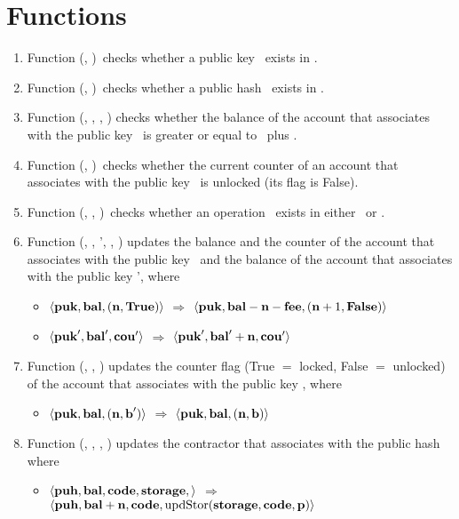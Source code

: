 \documentclass[a4paper]{llncs}
\begin{document}
\section{Functions}
\begin{enumerate}
    \item Function \CHECKPUB (\PUK, \MANAGERS)\ checks whether a public key \PUK\ exists in \MANAGERS.
    \item Function \CHECKPUH (\PUH, \CONTRACTORS)\ checks whether a public hash \PUH\ exists in \CONTRACTORS.
    \item Function \CHECKBAL (\MANAGERS, \PUK, \NTEZ, \MTEZ) checks whether the balance of the account that associates with the public key \PUK\ is greater or equal to \NTEZ\ plus \MTEZ.
    \item Function \CHECKCOU (\MANAGERS, \PUK)\ checks whether the current counter of an account that associates with the public key \PUK\ is unlocked (its flag is False).
    \item Function \CHECKEXIST (\OPH, \PENDING, \ACCEPTED)\ checks whether an operation  \OPH\ exists in either \PENDING\ or \ACCEPTED.
    \item Function \UPDATESUCC(\MANAGERS, \PUK, \PUK', \NTEZ, \MTEZ) updates the balance and the counter of the account that associates with the public key \PUK\ and the balance of the account that associates with the public key \PUK', where
    \begin{itemize}
        \item[]  $\langle  \textbf{puk}, \textbf{bal}, (\textbf{n}, \textbf{True}) \rangle $ $\Rightarrow$ $\langle  \textbf{puk}, \textbf{bal} - \textbf{n} - \textbf{fee}, (\textbf{n} + 1, \textbf{False}) \rangle $      
        \item[] $\langle  \textbf{puk}', \textbf{bal}', \textbf{cou}' \rangle$ $\Rightarrow$ $\langle  \textbf{puk}', \textbf{bal}' + \textbf{n}, \textbf{cou}' \rangle $         
    \end{itemize}
    
    \item Function \UPDATECOU(\MANAGERS, \PUK, \BOOLEAN) updates the counter flag (True $=$ locked, False $=$ unlocked) of the account that associates with the public key \PUK, where
    \begin{itemize}
        \item[]  $\langle  \textbf{puk}, \textbf{bal}, (\textbf{n}, \textbf{b}') \rangle $ $\Rightarrow$ $\langle  \textbf{puk}, \textbf{bal}, (\textbf{n}, \textbf{b}) \rangle $ 
    \end{itemize}
    
    \item Function  \UPDATECONSTR (\CONTRACTORS, \PUH, \NTEZ, \PARAMETER) updates the contractor that associates with the public hash \PUH\, where
    \begin{itemize}
        \item[] $\langle  \textbf{puh}, \textbf{bal}, \textbf{code}, \textbf{storage}, \rangle $ $\Rightarrow$ $\langle  \textbf{puh}, \textbf{bal} + \textbf{n}, \textbf{code}, \\ \textup{updStor}(\textbf{storage},\textbf{code},\textbf{p}) \rangle $
    \end{itemize}
    

\end{enumerate}
\end{document}
